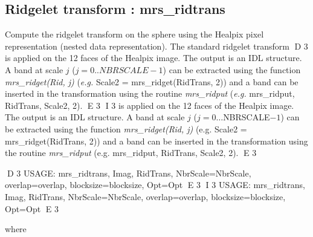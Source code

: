\subsection{Ridgelet transform : mrs\_ridtrans}
Compute the ridgelet transform on the sphere using the Healpix pixel representation (nested data representation). The standard ridgelet transform 
D 3
is applied on the 12 faces of the Healpix image. The output is an IDL structure. A band at scale $j$ ($j=0..NBRSCALE-1$) can be extracted using 
the function {\em mrs\_ridget(Rid, j)} (\emph{e.g.} Scale2 = mrs\_ridget(RidTrans, 2)) and a band can be inserted in the transformation using 
the routine {\em mrs\_ridput} (\emph{e.g.}  mrs\_ridput, RidTrans, Scale2, 2).
E 3
I 3
is applied on the 12 faces of the Healpix image. The output is an IDL structure. A band at scale $j$ ($j=0\ldots$NBRSCALE$-1$) can be extracted using 
the function {\em mrs\_ridget(Rid, j)} (e.g. Scale2 = mrs\_ridget(RidTrans, 2)) and a band can be inserted in the transformation using 
the routine {\em mrs\_ridput} (e.g. mrs\_ridput, RidTrans, Scale2, 2).
E 3
{\bf
\begin{center}
D 3
     USAGE:  mrs\_ridtrans, Imag, RidTrans, NbrScale=NbrScale, overlap=overlap, blocksize=blocksize, Opt=Opt 
E 3
I 3
     USAGE: mrs\_ridtrans, Imag, RidTrans, NbrScale=NbrScale, overlap=overlap, blocksize=blocksize, Opt=Opt 
E 3
\end{center}}
where
